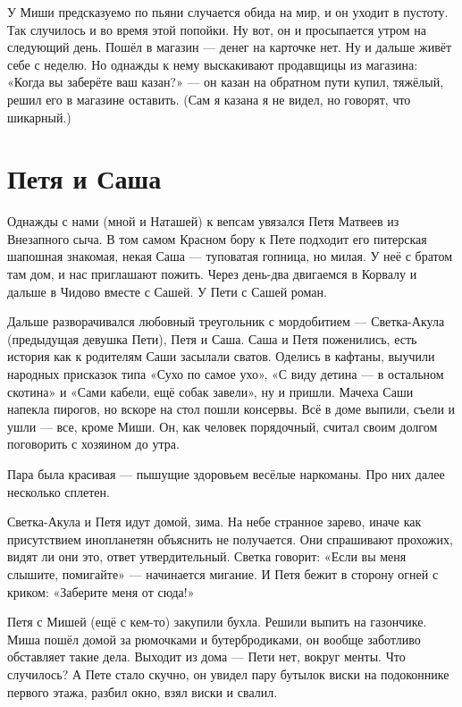 \documentclass{book}
\begin{document}
У Миши предсказуемо по пьяни случается обида на мир, и он уходит в пустоту.
Так случилось и во время этой попойки.
Ну вот, он и просыпается утром на следующий день.
Пошёл в магазин --- денег на карточке нет.
Ну и дальше живёт себе с неделю.
Но однажды к нему выскакивают продавщицы из магазина: «Когда вы заберёте ваш казан?» --- он казан на обратном пути купил, тяжёлый, решил его в магазине оставить.
(Сам я казана я не видел, но говорят, что шикарный.)


\section*{Петя и Саша}

Однажды с нами (мной и Наташей) к вепсам увязался Петя Матвеев из Внезапного сыча.
В том самом Красном бору к Пете подходит его питерская шапошная знакомая, некая Саша ---
туповатая гопница, но милая.
У неё с братом там дом, и нас приглашают пожить.
Через день-два двигаемся в Корвалу и дальше в Чидово вместе с Сашей.
У Пети с Сашей роман.

Дальше разворачивался любовный треугольник с мордобитием --- Светка-Акула (предыдущая девушка Пети), Петя и Саша.
Саша и Петя поженились, есть история как к родителям Саши засылали сватов.
Оделись в кафтаны, выучили народных присказок типа «Сухо по самое ухо», «С виду детина --- в остальном скотина» и «Сами кабели, ещё собак завели», ну и пришли.
Мачеха Саши напекла пирогов, но вскоре на стол пошли консервы.
Всё в доме выпили, съели и ушли --- все, кроме Миши.
Он, как человек порядочный, считал своим долгом поговорить с хозяином до утра.

Пара была красивая --- пышущие здоровьем весёлые наркоманы.
Про них далее несколько сплетен.

 Светка-Акула и Петя идут домой, зима.
На небе странное зарево, иначе как присутствием инопланетян объяснить не получается.
Они спрашивают прохожих, видят ли они это, ответ утвердительный.
Светка говорит: «Если вы меня слышите, помигайте» --- начинается мигание.
И Петя бежит в сторону огней с криком: «Заберите меня от сюда!»

Петя с Мишей (ещё с кем-то) закупили бухла.
Решили выпить на газончике.
Миша пошёл домой за рюмочками и бутербродиками, он вообще заботливо обставляет такие дела.
Выходит из дома --- Пети нет, вокруг менты.
Что случилось?
А Пете стало скучно, он увидел пару бутылок виски на подоконнике первого этажа, разбил окно, взял виски и свалил.
\end{document}
